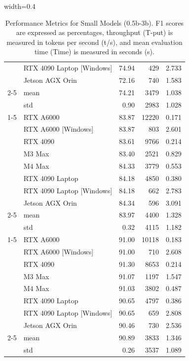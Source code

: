 \documentclass[conference]{IEEEtran}
\begin{document}
\begin{table}[htbp]
\begin{adjustbox}{width=0.4\textwidth}
\begin{tabular}{llrrr}
 & RTX 4090 Laptop [Windows] & 74.94 & 429 & 2.733 \\
 & Jetson AGX Orin & 72.16 & 740 & 1.583 \\
 \cmidrule(lr){2-5}
 & mean & 74.21 & 3479 & 1.038 \\
 & std & 0.90 & 2983 & 1.028 \\
\cline{1-5}
\multirow[t]{10}{*}{llama3.2:3b} & RTX A6000 & 83.87 & 12220 & 0.171 \\
 & RTX A6000 [Windows] & 83.87 & 803 & 2.601 \\
 & RTX 4090 & 83.61 & 9766 & 0.214 \\
 & M3 Max & 83.40 & 2521 & 0.829 \\
 & M4 Max & 84.33 & 3779 & 0.553 \\
 & RTX 4090 Laptop & 84.18 & 4850 & 0.380 \\
 & RTX 4090 Laptop [Windows] & 84.18 & 662 & 2.783 \\
 & Jetson AGX Orin & 84.34 & 596 & 3.091 \\
 \cmidrule(lr){2-5}
 & mean & 83.97 & 4400 & 1.328 \\
 & std & 0.32 & 4115 & 1.182 \\
\cline{1-5}
\multirow[t]{10}{*}{qwen2.5:3b} & RTX A6000 & 91.00 & 10118 & 0.183 \\
 & RTX A6000 [Windows] & 91.00 & 710 & 2.608 \\
 & RTX 4090 & 91.30 & 8653 & 0.214 \\
 & M3 Max & 91.07 & 1197 & 1.547 \\
 & M4 Max & 91.03 & 3802 & 0.487 \\
 & RTX 4090 Laptop & 90.65 & 4797 & 0.386 \\
 & RTX 4090 Laptop [Windows] & 90.65 & 659 & 2.808 \\
 & Jetson AGX Orin & 90.46 & 730 & 2.536 \\
 \cmidrule(lr){2-5}
 & mean & 90.89 & 3833 & 1.346 \\
 & std & 0.26 & 3537 & 1.089 \\
\bottomrule
\end{tabular}
    \end{adjustbox}
    \caption{Performance Metrics for Small Models (0.5b-3b). F1 scores are expressed as percentages, throughput (T-put) is measured in tokens per second (t/s), and mean evaluation time (Time) is measured in seconds (s).}
    \label{tab:small-models}
\end{table}
\end{document}
